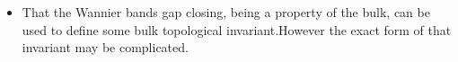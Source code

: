 \documentclass{beamer}
\renewcommand{\(}{\left(}
\renewcommand{\)}{\right)}
\renewcommand{\[}{\left[}
\renewcommand{\]}{\right]}
\begin{document}
\begin{frame}
\begin{figure}[t]
    \end{figure}
    \begin{itemize}
        \item That the Wannier bands gap closing, being a property of the bulk, can be used to define some bulk topological invariant.However the exact form of that invariant may be complicated. 
    \end{itemize} 
\end{frame}
\end{document}
